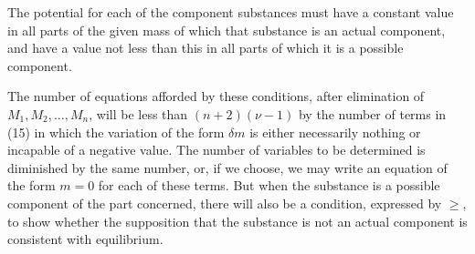 \documentclass[11pt]{article}
\begin{document}
The potential for each of the component substances must have a constant value in all parts of the given mass of which that substance is an actual component, and have a value not less than this in all parts of which it is a possible component.

The number of equations afforded by these conditions, after elimination of \(M_1,M_2,\ldots,M_n\), will be less than \((n+2)(\nu-1)\) by the number of terms in (15) in which the variation of the form \(\delta m\) is either necessarily nothing or incapable of a negative value. The number of variables to be determined is diminished by the same number, or, if we choose, we may write an equation of the form \(m=0\) for each of these terms. But when the substance is a possible component of the part concerned, there will also be a condition, expressed by \(\geq\), to show whether the supposition that the substance is not an actual component is consistent with equilibrium.
\end{document}
